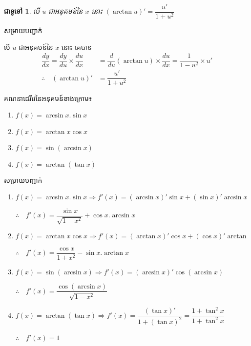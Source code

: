 \documentclass[12pt,fleqn]{book} %
\newtheorem{general}{\kml ជាទូទៅ}
\newcommand{\solution}{{\begin{center}\kml \color{blue} សម្រាយបញ្ជាក់\end{center} }}
\begin{document}
\begin{general}
បើ $u$ ជាអនុគមន៍នៃ $x$ នោះ $(\arctan u)'=\dfrac{u'}{1+u^2}$
\end{general}
\solution 
បើ $u$ ជាអនុគមន៍នៃ $x$ នោះ  គេបាន 
\begin{align*}
\dfrac{dy}{dx}=\dfrac{dy}{du}\times \dfrac{du}{dx}&=\dfrac{d}{du}(\arctan u)\times \dfrac{du}{dx}=\dfrac{1}{1-u^2}\times u'\\
\therefore \quad (\arctan u)'&=\dfrac{u'}{1+u^2}
\end{align*}
\begin{example}
គណនាដេរីវេនៃអនុគមន៍ខាងក្រោម៖
\begin{multicols}{2}
\begin{enumerate}
\item $f(x)=\arcsin x.\sin x$
\item $f(x)=\arctan x\cos x$
\item $f(x)=\sin (\arcsin x)$
\item $f(x)=\arctan (\tan x)$
\end{enumerate}
\end{multicols}
\end{example}
\solution
\begin{enumerate}
\item $f(x)=\arcsin x.\sin x \Longrightarrow f'(x)=(\arcsin x)'\sin x+(\sin x)'\arcsin x$
\begin{center}
$\therefore \quad f'(x)=\dfrac{\sin x}{\sqrt{1-x^2}}+\cos x.\arcsin x$
\end{center}
\item $f(x)=\arctan x\cos x\Longrightarrow f'(x)=(\arctan x)'\cos x+(\cos x)'\arctan$
\begin{center}
$\therefore \quad f'(x)=\dfrac{\cos x}{1+x^2}-\sin x.\arctan x$
\end{center}
\item $f(x)=\sin (\arcsin x)\Longrightarrow f'(x)=(\arcsin x)'\cos (\arcsin x)$
\begin{center}
$\therefore \quad f'(x)=\dfrac{\cos (\arcsin x)}{\sqrt{1-x^2}}$
\end{center}
\item $f(x)=\arctan (\tan x)\Longrightarrow f'(x)=\dfrac{(\tan x)'}{1+(\tan x)^2}=\dfrac{1+\tan^2 x}{1+\tan^2 x}$
\begin{center}
$\therefore \quad f'(x)=1$
\end{center}
\end{enumerate}
\end{document}
